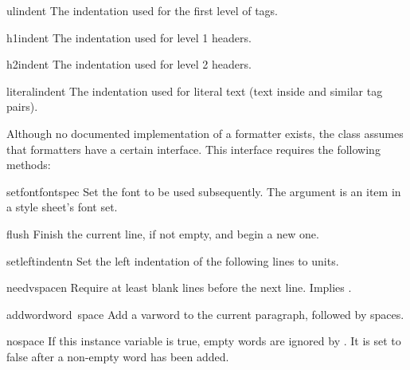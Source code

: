 \begin{datadesc}{ulindent}
The indentation used for the first level of  tags.
\end{datadesc}

\begin{datadesc}{h1indent}
The indentation used for level 1 headers.
\end{datadesc}

\begin{datadesc}{h2indent}
The indentation used for level 2 headers.
\end{datadesc}

\begin{datadesc}{literalindent}
The indentation used for literal text (text inside
 and similar tag pairs).
\end{datadesc}

Although no documented implementation of a formatter exists, the
 class assumes that formatters have a
certain interface.  This interface requires the following methods:

\begin{funcdesc}{setfont}{fontspec}
Set the font to be used subsequently.  The  argument is
an item in a style sheet's font set.
\end{funcdesc}

\begin{funcdesc}{flush}{}
Finish the current line, if not empty, and begin a new one.
\end{funcdesc}

\begin{funcdesc}{setleftindent}{n}
Set the left indentation of the following lines to  units.
\end{funcdesc}

\begin{funcdesc}{needvspace}{n}
Require at least  blank lines before the next line.  Implies
.
\end{funcdesc}

\begin{funcdesc}{addword}{word\, space}
Add a var{word} to the current paragraph, followed by 
spaces.
\end{funcdesc}

\begin{datadesc}{nospace}
If this instance variable is true, empty words are ignored by
.  It is set to false after a non-empty word has been
added.
\end{datadesc}

